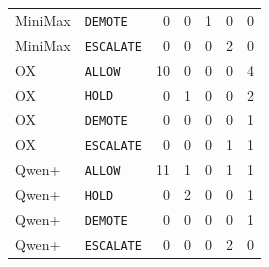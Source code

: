 \documentclass[10pt]{article}
\newcommand{\allow}{\texttt{ALLOW}}
\newcommand{\hold}{\texttt{HOLD}}
\newcommand{\demote}{\texttt{DEMOTE}}
\newcommand{\escalate}{\texttt{ESCALATE}}
\begin{document}
\begin{table}[htbp]
\begin{minipage}[t]{0.49\textwidth}
\begin{tabular}{@{}llrrrrr@{}}
MiniMax & \demote{} & 0&0&1&0&0 \\
MiniMax & \escalate{} & 0&0&0&2&0 \\
\midrule
OX & \allow{} & 10&0&0&0&4 \\
OX & \hold{} & 0&1&0&0&2 \\
OX & \demote{} & 0&0&0&0&1 \\
OX & \escalate{} & 0&0&0&1&1 \\
\midrule
Qwen+ & \allow{} & 11&1&0&1&1 \\
Qwen+ & \hold{} & 0&2&0&0&1 \\
Qwen+ & \demote{} & 0&0&0&0&1 \\
Qwen+ & \escalate{} & 0&0&0&2&0 \\
\bottomrule
\end{tabular}
\end{minipage}
\end{table}
\end{document}
